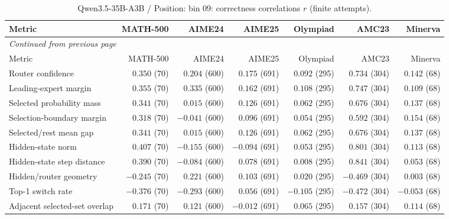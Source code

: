 \begingroup\scriptsize\setlength{\tabcolsep}{4pt}
\begin{longtable}{@{}lrrrrrr@{}}
\caption{Qwen3.5-35B-A3B / Position: bin 09: correctness correlations $r$ (finite attempts).}\label{tab:multi-qwen-position-bin_09}\\
\toprule
Metric & MATH-500 & AIME24 & AIME25 & Olympiad & AMC23 & Minerva \\
\midrule\endfirsthead
\multicolumn{7}{l}{\textit{Continued from previous page}}\\
\toprule
Metric & MATH-500 & AIME24 & AIME25 & Olympiad & AMC23 & Minerva \\
\midrule\endhead
\bottomrule\endfoot
Router confidence & $0.350$ (70) & $0.204$ (600) & $0.175$ (691) & $0.092$ (295) & $0.734$ (304) & $0.142$ (68) \\
Leading-expert margin & $0.355$ (70) & $0.335$ (600) & $0.162$ (691) & $0.108$ (295) & $0.747$ (304) & $0.109$ (68) \\
Selected probability mass & $0.341$ (70) & $0.015$ (600) & $0.126$ (691) & $0.062$ (295) & $0.676$ (304) & $0.137$ (68) \\
Selection-boundary margin & $0.318$ (70) & $-0.041$ (600) & $0.096$ (691) & $0.054$ (295) & $0.592$ (304) & $0.154$ (68) \\
Selected/rest mean gap & $0.341$ (70) & $0.015$ (600) & $0.126$ (691) & $0.062$ (295) & $0.676$ (304) & $0.137$ (68) \\
Hidden-state norm & $0.407$ (70) & $-0.155$ (600) & $-0.094$ (691) & $0.053$ (295) & $0.801$ (304) & $0.113$ (68) \\
Hidden-state step distance & $0.390$ (70) & $-0.084$ (600) & $0.078$ (691) & $0.008$ (295) & $0.841$ (304) & $0.053$ (68) \\
Hidden/router geometry & $-0.245$ (70) & $0.221$ (600) & $0.103$ (691) & $0.020$ (295) & $-0.469$ (304) & $0.003$ (68) \\
Top-1 switch rate & $-0.376$ (70) & $-0.293$ (600) & $0.056$ (691) & $-0.105$ (295) & $-0.472$ (304) & $-0.053$ (68) \\
Adjacent selected-set overlap & $0.171$ (70) & $0.121$ (600) & $-0.012$ (691) & $0.065$ (295) & $0.157$ (304) & $0.114$ (68) \\
\end{longtable}\endgroup

